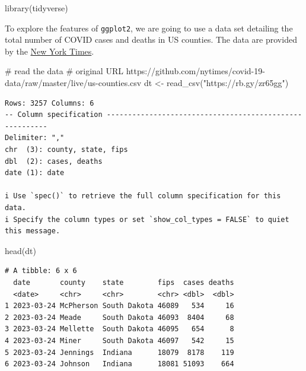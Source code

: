 \documentclass[
  letterpaper,
  DIV=11,
  numbers=noendperiod]{scrreprt}
\newenvironment{Shaded}{\begin{snugshade}}{\end{snugshade}}
\newcommand{\CommentTok}[1]{\textcolor[rgb]{0.37,0.37,0.37}{#1}}
\newcommand{\FunctionTok}[1]{\textcolor[rgb]{0.28,0.35,0.67}{#1}}
\newcommand{\NormalTok}[1]{\textcolor[rgb]{0.00,0.23,0.31}{#1}}
\newcommand{\OtherTok}[1]{\textcolor[rgb]{0.00,0.23,0.31}{#1}}
\newcommand{\StringTok}[1]{\textcolor[rgb]{0.13,0.47,0.30}{#1}}
\begin{document}
\begin{Shaded}
\begin{Highlighting}[]
\FunctionTok{library}\NormalTok{(tidyverse)}
\end{Highlighting}
\end{Shaded}

To explore the features of \texttt{ggplot2}, we are going to use a data
set detailing the total number of COVID cases and deaths in US counties.
The data are provided by the
\href{https://github.com/nytimes/covid-19-data/blob/master/live/us-counties.csv}{New
York Times}.

\begin{Shaded}
\begin{Highlighting}[]
\CommentTok{\# read the data}
\CommentTok{\# original URL https://github.com/nytimes/covid{-}19{-}data/raw/master/live/us{-}counties.csv}
\NormalTok{dt }\OtherTok{\textless{}{-}} \FunctionTok{read\_csv}\NormalTok{(}\StringTok{"https://rb.gy/zr65gg"}\NormalTok{)}
\end{Highlighting}
\end{Shaded}

\begin{verbatim}
Rows: 3257 Columns: 6
-- Column specification --------------------------------------------------------
Delimiter: ","
chr  (3): county, state, fips
dbl  (2): cases, deaths
date (1): date

i Use `spec()` to retrieve the full column specification for this data.
i Specify the column types or set `show_col_types = FALSE` to quiet this message.
\end{verbatim}

\begin{Shaded}
\begin{Highlighting}[]
\FunctionTok{head}\NormalTok{(dt)}
\end{Highlighting}
\end{Shaded}

\begin{verbatim}
# A tibble: 6 x 6
  date       county    state        fips  cases deaths
  <date>     <chr>     <chr>        <chr> <dbl>  <dbl>
1 2023-03-24 McPherson South Dakota 46089   534     16
2 2023-03-24 Meade     South Dakota 46093  8404     68
3 2023-03-24 Mellette  South Dakota 46095   654      8
4 2023-03-24 Miner     South Dakota 46097   542     15
5 2023-03-24 Jennings  Indiana      18079  8178    119
6 2023-03-24 Johnson   Indiana      18081 51093    664
\end{verbatim}
\end{document}
